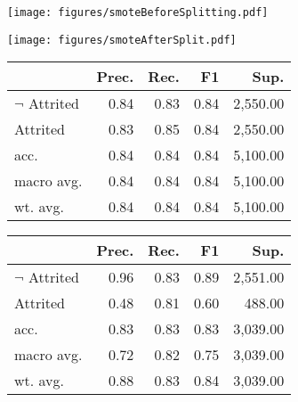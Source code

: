 \begin{figure*}[!ht]
    \begin{minipage}{0.45\textwidth}
        \centering
        \texttt{[image: figures/smoteBeforeSplitting.pdf]}
        \label{fig:sampling_leakage1}
        \vspace{1cm}
    \end{minipage}
    \hfill
    \begin{minipage}{0.45\textwidth}
        \centering
        \texttt{[image: figures/smoteAfterSplit.pdf]}
        \label{fig:sampling_leakage2}
    \end{minipage}
    \vfill
    \begin{minipage}{0.45\textwidth}
        \centering
        \begin{tabular}{lrrrr}
            \toprule
            {} &  Prec. &  Rec. &  F1 &   Sup. \\
            \midrule
            $\neg$ Attrited &      0.84 &   0.83 &     0.84 & 2,550.00 \\
            Attrited &      0.83 &   0.85 &     0.84 & 2,550.00 \\
            acc.          &      0.84 &   0.84 &     0.84 &    5,100.00 \\
            macro avg.         &      0.84 &   0.84 &     0.84 & 5,100.00 \\
            wt. avg.      &      0.84 &   0.84 &     0.84 & 5,100.00 \\
        \bottomrule
        \end{tabular}
        \label{tab:samp_leak}
    \end{minipage}
    \hfill
    \begin{minipage}{0.45\textwidth}
        \centering
        \begin{tabular}{lrrrr}
            \toprule
            {} &  Prec. &  Rec. &  F1 &   Sup. \\
            \midrule
            $\neg$ Attrited &      0.96 &   0.83 &     0.89 & 2,551.00 \\
            Attrited &      0.48 &   0.81 &     0.60 &   488.00 \\
            acc.          &      0.83 &   0.83 &     0.83 &   3,039.00 \\
            macro avg.         &      0.72 &   0.82 &     0.75 & 3,039.00 \\
            wt. avg.      &      0.88 &   0.83 &     0.84 & 3,039.00 \\

\end{tabular}
\end{minipage}
\end{figure*}
